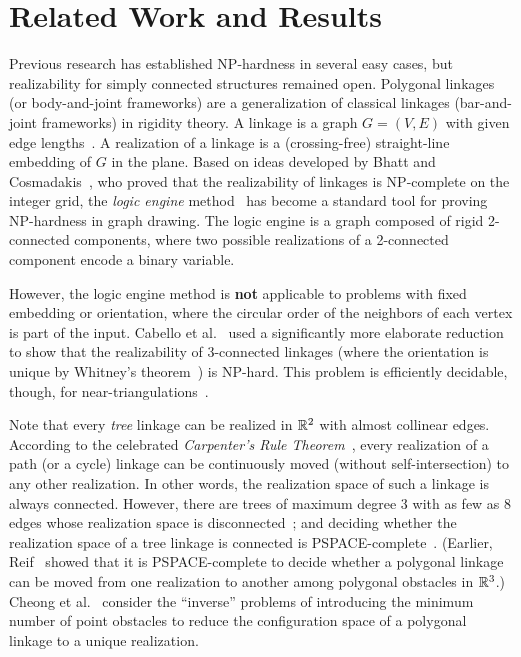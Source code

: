 \section{Related Work and Results}
Previous research has established NP-hardness in several easy cases, but realizability for simply connected structures remained open. Polygonal linkages (or body-and-joint frameworks) are a generalization of classical linkages (bar-and-joint frameworks) in rigidity theory. A linkage is a graph $G=(V,E)$ with given edge lengths~\cite{CD-ch9}. A realization of a linkage is a (crossing-free) straight-line embedding of $G$ in the plane. Based on ideas developed by Bhatt and Cosmadakis~\cite{BC87}, who proved that the realizability of linkages is NP-complete on the integer grid, the \emph{logic engine} method~\cite{BET+99,EW96,FHW97,HK01} has become a standard tool for proving NP-hardness in graph drawing. The logic engine is a graph composed of rigid 2-connected components, where two possible realizations of a 2-connected component encode a binary variable.

However, the logic engine method is \textbf{not} applicable to problems with fixed embedding or orientation, where the circular order of the neighbors of each vertex is part of the input. Cabello et al.~\cite{CDR07,EW90} used a significantly more elaborate reduction to show that the realizability of 3-connected linkages (where the orientation is unique by Whitney's theorem~\cite{W33}) is NP-hard. This problem is efficiently decidable, though, for near-triangulations~\cite{CDR07,BV96}.

Note that every \emph{tree} linkage can be realized in $\mathbb{R}^2$ with almost collinear edges. According to the celebrated \emph{Carpenter's Rule Theorem}~\cite{CDR03,Str05}, every realization of a path (or a cycle) linkage can be continuously moved (without self-intersection) to any other realization. In other words, the realization space of such a linkage is always connected. However, there are trees of maximum degree 3 with as few as 8 edges whose realization space is disconnected~\cite{BCD+09}; and deciding whether the realization space of a tree linkage is connected is PSPACE-complete~\cite{AKR+04}.
(Earlier, Reif~\cite{Rei79} showed that it is PSPACE-complete to decide whether a polygonal linkage can be moved from one realization to another among polygonal obstacles in $\mathbb{R}^3$.)
Cheong et al.~\cite{CdG+07} consider the ``inverse'' problems of introducing the minimum number of point obstacles to reduce the configuration space of a polygonal linkage to a unique realization.

